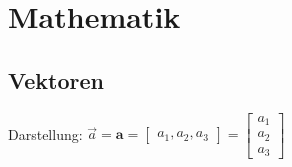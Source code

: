 \section{Mathematik}

\subsection{Vektoren}

Darstellung:
	$\overrightarrow{a} = \mathbf{a} = \begin{bmatrix} a_1, a_2, a_3 \end{bmatrix} = \begin{bmatrix} a_1 \\ a_2 \\ a_3 \end{bmatrix}$

